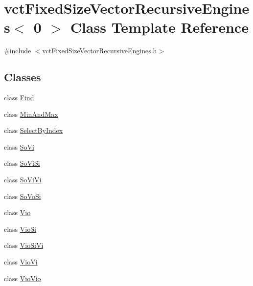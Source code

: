 \hypertarget{classvct_fixed_size_vector_recursive_engines_3_010_01_4}{}\section{vct\+Fixed\+Size\+Vector\+Recursive\+Engines$<$ 0 $>$ Class Template Reference}
\label{classvct_fixed_size_vector_recursive_engines_3_010_01_4}


{\ttfamily \#include $<$vct\+Fixed\+Size\+Vector\+Recursive\+Engines.\+h$>$}

\subsection*{Classes}
\begin{DoxyCompactItemize}
\item 
class \hyperlink{classvct_fixed_size_vector_recursive_engines_3_010_01_4_1_1_find}{Find}
\item 
class \hyperlink{classvct_fixed_size_vector_recursive_engines_3_010_01_4_1_1_min_and_max}{Min\+And\+Max}
\item 
class \hyperlink{classvct_fixed_size_vector_recursive_engines_3_010_01_4_1_1_select_by_index}{Select\+By\+Index}
\item 
class \hyperlink{classvct_fixed_size_vector_recursive_engines_3_010_01_4_1_1_so_vi}{So\+Vi}
\item 
class \hyperlink{classvct_fixed_size_vector_recursive_engines_3_010_01_4_1_1_so_vi_si}{So\+Vi\+Si}
\item 
class \hyperlink{classvct_fixed_size_vector_recursive_engines_3_010_01_4_1_1_so_vi_vi}{So\+Vi\+Vi}
\item 
class \hyperlink{classvct_fixed_size_vector_recursive_engines_3_010_01_4_1_1_so_vo_si}{So\+Vo\+Si}
\item 
class \hyperlink{classvct_fixed_size_vector_recursive_engines_3_010_01_4_1_1_vio}{Vio}
\item 
class \hyperlink{classvct_fixed_size_vector_recursive_engines_3_010_01_4_1_1_vio_si}{Vio\+Si}
\item 
class \hyperlink{classvct_fixed_size_vector_recursive_engines_3_010_01_4_1_1_vio_si_vi}{Vio\+Si\+Vi}
\item 
class \hyperlink{classvct_fixed_size_vector_recursive_engines_3_010_01_4_1_1_vio_vi}{Vio\+Vi}
\item 
class \hyperlink{classvct_fixed_size_vector_recursive_engines_3_010_01_4_1_1_vio_vio}{Vio\+Vio}

\end{DoxyCompactItemize}
